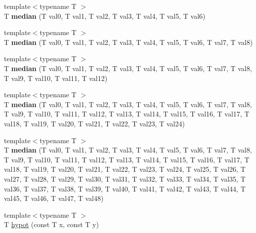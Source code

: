 \begin{DoxyCompactItemize}
{\footnotesize template$<$typename T $>$ }\\T {\bfseries median} (T val0, T val1, T val2, T val3, T val4, T val5, T val6)
\item 
\mbox{\label{namespacecimg__library__suffixed_1_1cimg_a76eb106e5afc159f8ec892ddb206de1c}} 
{\footnotesize template$<$typename T $>$ }\\T {\bfseries median} (T val0, T val1, T val2, T val3, T val4, T val5, T val6, T val7, T val8)
\item 
\mbox{\label{namespacecimg__library__suffixed_1_1cimg_ab87bc357192941440852178fc4820463}} 
{\footnotesize template$<$typename T $>$ }\\T {\bfseries median} (T val0, T val1, T val2, T val3, T val4, T val5, T val6, T val7, T val8, T val9, T val10, T val11, T val12)
\item 
\mbox{\label{namespacecimg__library__suffixed_1_1cimg_aa147071742c37d4ed5698c612b2ff2f6}} 
{\footnotesize template$<$typename T $>$ }\\T {\bfseries median} (T val0, T val1, T val2, T val3, T val4, T val5, T val6, T val7, T val8, T val9, T val10, T val11, T val12, T val13, T val14, T val15, T val16, T val17, T val18, T val19, T val20, T val21, T val22, T val23, T val24)
\item 
\mbox{\label{namespacecimg__library__suffixed_1_1cimg_ab28b23392cce9895840d93df30fb2db6}} 
{\footnotesize template$<$typename T $>$ }\\T {\bfseries median} (T val0, T val1, T val2, T val3, T val4, T val5, T val6, T val7, T val8, T val9, T val10, T val11, T val12, T val13, T val14, T val15, T val16, T val17, T val18, T val19, T val20, T val21, T val22, T val23, T val24, T val25, T val26, T val27, T val28, T val29, T val30, T val31, T val32, T val33, T val34, T val35, T val36, T val37, T val38, T val39, T val40, T val41, T val42, T val43, T val44, T val45, T val46, T val47, T val48)
\item 
\mbox{\label{namespacecimg__library__suffixed_1_1cimg_af556f826a8b7acb2fbbaa5259e6d95e8}} 
{\footnotesize template$<$typename T $>$ }\\T \hyperlink{namespacecimg__library__suffixed_1_1cimg_af556f826a8b7acb2fbbaa5259e6d95e8}{hypot} (const T x, const T y)

\end{DoxyCompactItemize}
